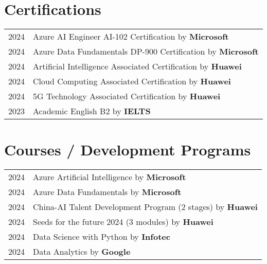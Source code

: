 \documentclass[a4paper,12pt]{article}
\begin{document}
\section{Certifications}
\begin{tabularx}{\linewidth}{@{}l X@{}}	
2024 & Azure AI Engineer AI-102 Certification by \textbf{Microsoft} \hfill  \\

2024 & Azure Data Fundamentals DP-900 Certification by \textbf{Microsoft} \hfill \normalsize \\

2024 & Artificial Intelligence Associated Certification by \textbf{Huawei} \hfill \\ 

2024 & Cloud Computing Associated Certification by \textbf{Huawei} \hfill \\

2024 & 5G Technology Associated Certification by \textbf{Huawei} \hfill \\

2023 & Academic English B2 by \textbf{IELTS} \hfill \\
\end{tabularx}

\section{Courses / Development Programs}
\begin{tabularx}{\linewidth}{@{}l X@{}}	
2024 & Azure Artificial Intelligence by \textbf{Microsoft} \hfill  \\

2024 & Azure Data Fundamentals by \textbf{Microsoft} \hfill \normalsize \\

2024 & China-AI Talent Development Program (2 stages) by \textbf{Huawei} \hfill \\ 

2024 & Seeds for the future 2024 (3 modules) by \textbf{Huawei} \hfill \\

2024 & Data Science with Python by \textbf{Infotec} \hfill \\

2024 & Data Analytics by \textbf{Google} \hfill \\
\end{tabularx}
\end{document}
